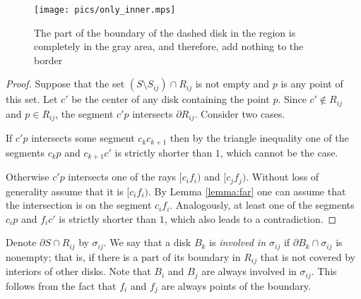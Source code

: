 \begin{figure}[h!]
    \centering
    \texttt{[image: pics/only\_inner.mps]}
    \captionsetup{width=.7\textwidth}
    \caption{The part of the boundary of the dashed disk in the region is completely in the gray area, and therefore, add nothing to the border}
    \label{fig:only_inner}
\end{figure}


\begin{proof}
Suppose that the set $(S\setminus S_{ij})\cap R_{ij}$ is not empty and $p$ is any point of this set.
Let $c'$ be the center of any disk containing the point $p$. Since $c'\not\in R_{ij}$ and $p\in R_{ij}$, the segment $c'p$ intersects $\partial{R_{ij}}$. Consider two cases.

If $c'p$ intersects some segment $c_kc_{k+1}$ then by the triangle inequality one of the segments $c_kp$ and $c_{k+1}c'$ is strictly shorter than $1$, which cannot be the case.

Otherwise $c'p$ intersects one of the rays $[c_if_i)$ and $[c_jf_j)$. Without loss of generality assume that it is $[c_if_i)$. By Lemma \ref{lemma:far} one can assume that the intersection is on the segment $c_if_i$. Analogously, at least one of the segments $c_ip$ and $f_ic'$ is strictly shorter than $1$, which also leads to a contradiction.
\end{proof}


Denote $\partial S\cap R_{ij}$ by $\sigma_{ij}$.
We say that a disk $B_k$ is \textit{involved in $\sigma_{ij}$} if $\partial{B_k}\cap \sigma_{ij}$ is nonempty; that is, if there is a part of its boundary in $R_{ij}$ that is not covered by interiors of other disks. %
Note that $B_i$ and $B_j$ are always involved in $\sigma_{ij}$.
This follows from the fact that $f_i$ and $f_j$ are always points of the boundary.

